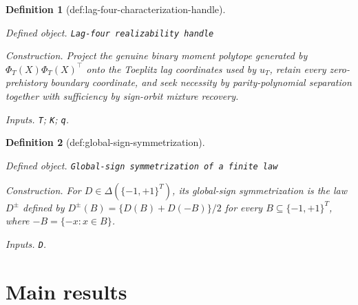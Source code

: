 \documentclass{article}
\newtheorem{definition}{Definition}
\begin{document}
\begin{definition}[def:lag-four-characterization-handle]\label{def:lag-four-characterization-handle}
\par\smallskip\noindent\emph{Defined object.} \texttt{Lag-\allowbreak{}four realizability handle}
\par\smallskip\noindent\emph{Construction.} Project the genuine binary moment polytope generated by \(\Phi_T(X)\Phi_T(X)^{\top}\) onto the Toeplitz lag coordinates used by \(u_T\), retain every zero-prehistory boundary coordinate, and seek necessity by parity-polynomial separation together with sufficiency by sign-orbit mixture recovery.
\par\smallskip\noindent\emph{Inputs.} \texttt{T}; \texttt{K}; \texttt{q}.
\end{definition}

\begin{definition}[def:global-sign-symmetrization]\label{def:global-sign-symmetrization}
\par\smallskip\noindent\emph{Defined object.} \texttt{Global-\allowbreak{}sign symmetrization of a finite law}
\par\smallskip\noindent\emph{Construction.} For \(D\in\Delta(\{-1,+1\}^T)\), its global-sign symmetrization is the law \(D^{\pm}\) defined by \(D^{\pm}(B)=\{D(B)+D(-B)\}/2\) for every \(B\subseteq\{-1,+1\}^T\), where \(-B=\{-x:x\in B\}\).
\par\smallskip\noindent\emph{Inputs.} \texttt{D}.
\end{definition}

\section{Main results}
\end{document}
